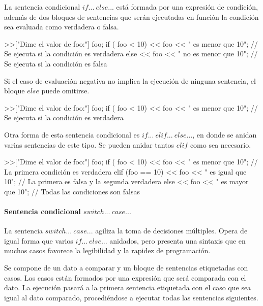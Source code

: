 La sentencia condicional $if...\ else...$ está formada por una expresión de condición, además de dos bloques de sentencias que serán ejecutadas en función la condición sea evaluada 
como verdadera o falsa. \\

\begin{myverbatim}
   >>["Dime el valor de foo:"] foo;
   if ( foo < 10) { 
      << foo << " es menor que 10"; // Se ejecuta si la condición es verdadera
   }
   else {
      << foo << " no es menor que 10"; // Se ejecuta si la condición es falsa
   }
\end{myverbatim}

Si el caso de evaluación negativa no implica la ejecución de ninguna sentencia, el bloque $else$ puede omitirse. \\

\begin{myverbatim}
   >>["Dime el valor de foo:"] foo;
   if ( foo < 10) { 
      << foo << " es menor que 10"; // Se ejecuta si la condición es verdadera
   }
\end{myverbatim}

Otra forma de esta sentencia condicional es $if...\ elif...\ else...$, en donde se anidan varias
sentencias de este tipo. Se pueden anidar tantos $elif$ como sea necesario.\\

\begin{myverbatim}
   >>["Dime el valor de foo:"] foo;
   if ( foo < 10) { 
      << foo << " es menor que 10"; // La primera condición es verdadera
   }
   elif (foo == 10) {
      << foo << " es igual que 10"; // La primera es falsa y la segunda verdadera
   }
   else {
      << foo << " es mayor que 10"; // Todas las condiciones son falsas
   }
\end{myverbatim}

\paragraph{Sentencia condicional $switch...\ case...$}
La sentencia $switch...\ case...$ agiliza la toma de decisiones múltiples. Opera de igual forma que varios 
$if...\ else...$ anidados, pero presenta una sintaxis que en muchos casos favorece la legibilidad y 
la rapidez de programación.

Se compone de un dato a comparar y un bloque de sentencias etiquetadas con casos. Los casos están formados por una expresión que 
será comparada con el dato. La ejecución pasará a la primera sentencia etiquetada
con el caso que sea igual al dato comparado, procediéndose a ejecutar todas las sentencias siguientes. \\

